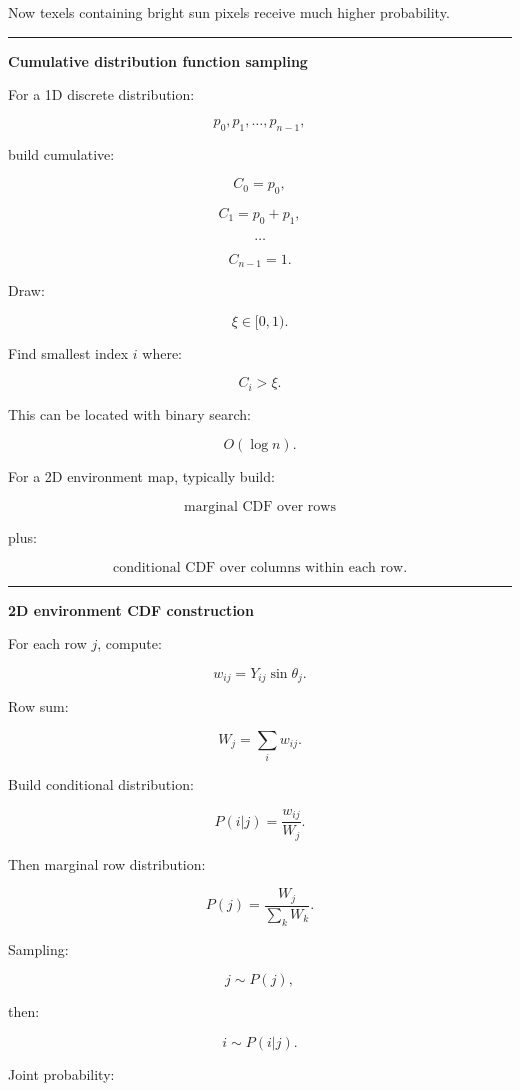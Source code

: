 Now texels containing bright sun pixels receive much higher probability.

\begin{center}\rule{0.5\linewidth}{0.5pt}\end{center}

\textbf{Cumulative distribution function sampling}

For a 1D discrete distribution:

\[
p_0,p_1,\dots,p_{n-1},
\]

build cumulative:

\[
C_0=p_0,
\]

\[
C_1=p_0+p_1,
\]

\[
\dots
\]

\[
C_{n-1}=1.
\]

Draw:

\[
\xi\in[0,1).
\]

Find smallest index \(i\) where:

\[
C_i>\xi.
\]

This can be located with binary search:

\[
O(\log n).
\]

For a 2D environment map, typically build:

\[
\boxed{
\text{marginal CDF over rows}
}
\]

plus:

\[
\boxed{
\text{conditional CDF over columns within each row}.
}
\]

\begin{center}\rule{0.5\linewidth}{0.5pt}\end{center}

\textbf{2D environment CDF construction}

For each row \(j\), compute:

\[
w_{ij}
=
Y_{ij}\sin\theta_j.
\]

Row sum:

\[
W_j=
\sum_iw_{ij}.
\]

Build conditional distribution:

\[
P(i|j)
=
\frac{w_{ij}}{W_j}.
\]

Then marginal row distribution:

\[
P(j)
=
\frac{W_j}{\sum_kW_k}.
\]

Sampling:

\[
j\sim P(j),
\]

then:

\[
i\sim P(i|j).
\]

Joint probability:

